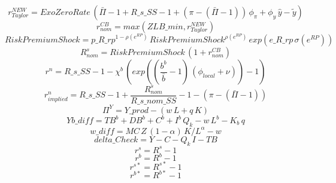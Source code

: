 \begin{dmath}
{ r_{Taylor}^{NEW} }={ExoZeroRate}\, \left({ \bar{\Pi} }-1+{R\_s\_SS}-1+\left({ \pi }-\left({ \bar{\Pi} }-1\right)\right)\, {\phi_{\pi}}+{\phi_{y}}\, { \hat{y} - \tilde{y} }\right)
\end{dmath}
\begin{dmath}
{ r^{CB}_{nom}}=max({ZLB\_min},{ r_{Taylor}^{NEW} })
\end{dmath}
\begin{dmath}
{ Risk Premium Shock }={p\_R\_rp}^{1-{\rho(e^{RP}) }}\, { Risk Premium Shock }^{{\rho(e^{RP}) }}\, exp\left({e\_R\_rp}\, {\sigma(e^{RP}) }\right)
\end{dmath}
\begin{dmath}
{ R^s_{nom}}={ Risk Premium Shock }\, \left(1+{ r^{CB}_{nom}}\right)
\end{dmath}
\begin{dmath}
{ r^n }={R\_s\_SS}-1-{\chi^b }\, \left(exp\left(\left(\frac{{b^b}}{{ \bar{b} }}-1\right)\, \left({\phi_{local}}+{\nu }\right)\right)-1\right)
\end{dmath}
\begin{dmath}
{r^n_{implied}}={R\_s\_SS}-1+\frac{{ R^s_{nom}}}{{R\_s\_nom\_SS}}-1-\left({ \pi }-\left({ \bar{\Pi} }-1\right)\right)
\end{dmath}
\begin{dmath}
{\Pi^Y}={Y\_prod}-\left({w}\, {L}+{q}\, {K}\right)
\end{dmath}
\begin{dmath}
{Yb\_diff}={TB^b}+{DB^b}+{C^b}+{I^b}\, { Q_k }-{w}\, {L^b}-{K_b}\, {q}
\end{dmath}
\begin{dmath}
{w\_diff}={MC}\, {Z}\, \left(1-{\alpha }\right)\, {K/L}^{{\alpha }}-{w}
\end{dmath}
\begin{dmath}
{delta\_Check}={Y}-{C}-{ Q_k }\, {I}-{TB}
\end{dmath}
\begin{dmath}
{r^s}={R^s}-1
\end{dmath}
\begin{dmath}
{r^b}={R^b}-1
\end{dmath}
\begin{dmath}
{r^{s*}}={R^{s*}}-1
\end{dmath}
\begin{dmath}
{r^{b*}}={R^{b*}}-1
\end{dmath}
